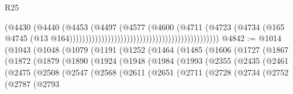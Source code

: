\begin{lexlean}{R25}
\begin{coremodule}
                                                                            (@4430
                                                                              (@4440
                                                                                (@4453
                                                                                  (@4497
                                                                                    (@4577
                                                                                      (@4600
                                                                                        (@4711
                                                                                          (@4723
                                                                                            (@4734
                                                                                              (@165
                                                                                                @4745
                                                                                                (@13
                                                                                                  @164)))))))))))))))))))))))))))))))))))))))))))))))
@4842 := @1014
    (@1043
      (@1048
        (@1079
          (@1191
            (@1252
              (@1464
                (@1485
                  (@1606
                    (@1727
                      (@1867
                        (@1872
                          (@1879
                            (@1890
                              (@1924
                                (@1948
                                  (@1984
                                    (@1993
                                      (@2355
                                        (@2435
                                          (@2461
                                            (@2475
                                              (@2508
                                                (@2547
                                                  (@2568
                                                    (@2611
                                                      (@2651
                                                        (@2711
                                                          (@2728
                                                            (@2734
                                                              (@2752
                                                                (@2787
                                                                  (@2793

\end{coremodule}
\end{lexlean}
